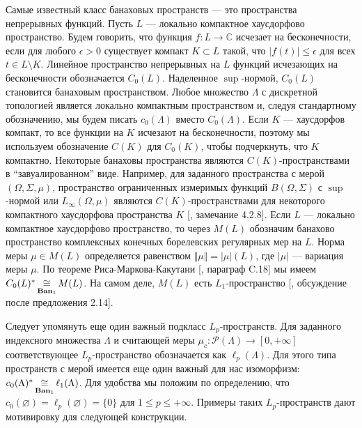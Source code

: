 Самые известный класс банаховых пространств --- это пространства непрерывных функций. Пусть $L$ --- локально компактное хаусдорфово пространство. Будем говорить, что функция $f:L\to\mathbb{C}$ исчезает на бесконечности, если для любого $\epsilon>0$ существует компакт $K\subset L$ такой, что $|f(t)|\leq\epsilon$ для всех $t\in L\setminus K$. Линейное пространство непрерывных на $L$ функций исчезающих на бесконечности обозначается $C_0(L)$. Наделенное $\sup$-нормой, $C_0(L)$ становится банаховым пространством. Любое множество $\Lambda$ с дискретной топологией является локально компактным пространством и, следуя стандартному обозначению, мы будем писать $c_0(\Lambda)$ вместо $C_0(\Lambda)$. Если $K$ --- хаусдорфов компакт, то все функции на $K$ исчезают на бесконечности, поэтому мы используем обозначение $C(K)$ для $C_0(K)$, чтобы подчеркнуть, что $K$ компактно. Некоторые банаховы пространства являются $C(K)$-пространствами в ``завуалированном'' виде. Например, для заданного пространства с мерой $(\Omega,\Sigma,\mu)$, пространство ограниченных измеримых функций $B(\Omega,\Sigma)$ с $\sup$-нормой или $L_\infty(\Omega,\mu)$ являются $C(K)$-пространствами для некоторого компактного хаусдорфова пространства $K$ [\cite{KalAlbTopicsBanSpTh}, замечание 4.2.8]. Если $L$ --- локально компактное хаусдорфово пространство, то через $M(L)$ обозначим банахово пространство комплексных конечных борелевских регулярных мер на $L$. Норма меры $\mu\in M(L)$ определяется равенством $\Vert\mu\Vert=|\mu|(L)$, где $|\mu|$ --- вариация меры $\mu$. По теореме Риса-Маркова-Какутани [\cite{ConwACoursInFuncAn}, параграф C.18] мы имеем $C_0(L)^*\mathop{\mathbin{\cong}}\limits_{\mathbf{Ban}_1}M(L)$. На самом деле, $M(L)$ есть $L_1$-пространство [\cite{DalLauSecondDualOfMeasAlg}, обсуждение после предложения 2.14]. 

Следует упомянуть еще один важный подкласс $L_p$-пространств. Для заданного индексного множества $\Lambda$ и считающей меры $\mu_c:\mathcal{P}(\Lambda)\to[0,+\infty]$ соответствующее $L_p$-пространство обозначается как $\ell_p(\Lambda)$. Для этого типа пространств с мерой имеется еще один важный для нас изоморфизм: $c_0(\Lambda)^*\mathop{\mathbin{\cong}}\limits_{\mathbf{Ban}_1}\ell_1(\Lambda)$. Для удобства мы положим по определению, что $c_0(\varnothing)=\ell_p(\varnothing)=\{0\}$ для $1\leq p\leq+\infty$. Примеры таких $L_p$-пространств дают мотивировку для следующей конструкции.

